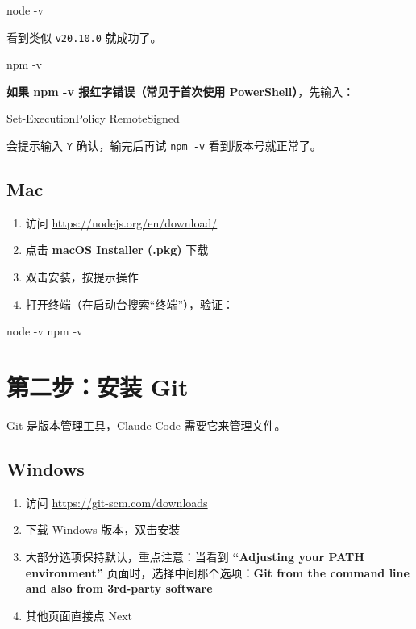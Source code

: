 \documentclass[12pt,a4paper]{ctexart}
\begin{document}
\begin{shcode}
node -v
\end{shcode}

看到类似 \texttt{v20.10.0} 就成功了。

\begin{shcode}
npm -v
\end{shcode}

\textbf{如果 npm -v 报红字错误（常见于首次使用 PowerShell）}，先输入：

\begin{shcode}
Set-ExecutionPolicy RemoteSigned
\end{shcode}

会提示输入 \texttt{Y} 确认，输完后再试 \texttt{npm -v} 看到版本号就正常了。

\subsection{Mac}

\begin{enumerate}[nosep]
    \item 访问 \url{https://nodejs.org/en/download/}
    \item 点击 \textbf{macOS Installer (.pkg)} 下载
    \item 双击安装，按提示操作
    \item 打开终端（在启动台搜索``终端''），验证：
\end{enumerate}

\begin{shcode}
node -v
npm -v
\end{shcode}

\section{第二步：安装 Git}

Git 是版本管理工具，Claude Code 需要它来管理文件。

\subsection{Windows}

\begin{enumerate}[nosep]
    \item 访问 \url{https://git-scm.com/downloads}
    \item 下载 Windows 版本，双击安装
    \item 大部分选项保持默认，重点注意：当看到 \textbf{``Adjusting your PATH environment''} 页面时，选择中间那个选项：\textbf{Git from the command line and also from 3rd-party software}
    \item 其他页面直接点 Next
\end{enumerate}
\end{document}
